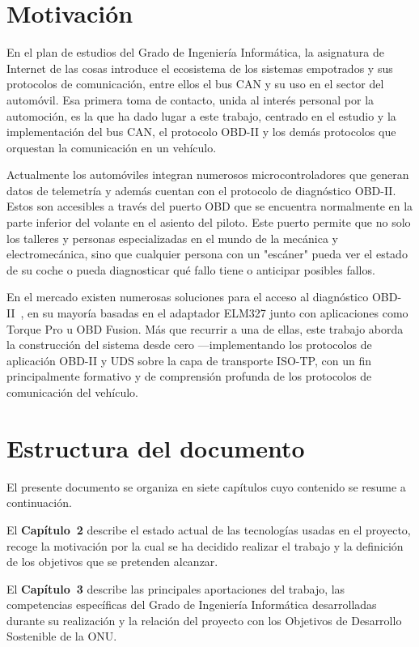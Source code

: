 \section{Motivación}

En el plan de estudios del Grado de Ingeniería Informática, la asignatura de Internet de las cosas introduce el ecosistema de los sistemas empotrados y sus protocolos de comunicación, entre ellos el bus CAN y su uso en el sector del automóvil. Esa primera toma de contacto, unida al interés personal por la automoción, es la que ha dado lugar a este trabajo, centrado en el estudio y la implementación del bus CAN, el protocolo OBD-II y los demás protocolos que orquestan la comunicación en un vehículo.

Actualmente los automóviles integran numerosos microcontroladores que generan datos de telemetría y además cuentan con el protocolo de diagnóstico OBD-II. Estos son accesibles a través del puerto OBD que se encuentra normalmente en la parte inferior del volante en el asiento del piloto. Este puerto permite que no solo los talleres y personas especializadas en el mundo de la mecánica y electromecánica, sino que cualquier persona con un "escáner" pueda ver el estado de su coche o pueda diagnosticar qué fallo tiene o anticipar posibles fallos.

En el mercado existen numerosas soluciones para el acceso al diagnóstico OBD-II~\cite{CSSElec_OBD2}, en su mayoría basadas en el adaptador ELM327 junto con aplicaciones como Torque Pro u OBD Fusion. Más que recurrir a una de ellas, este trabajo aborda la construcción del sistema desde cero —implementando los protocolos de aplicación OBD-II y UDS sobre la capa de transporte ISO-TP, con un fin principalmente formativo y de comprensión profunda de los protocolos de comunicación del vehículo.

\section{Estructura del documento}

El presente documento se organiza en siete capítulos cuyo contenido se resume a continuación.

El \textbf{Capítulo~2} describe el estado actual de las tecnologías usadas en el proyecto, recoge la motivación por la cual se ha decidido realizar el trabajo y la definición de los objetivos que se pretenden alcanzar.

El \textbf{Capítulo~3} describe las principales aportaciones del trabajo, las competencias específicas del Grado de Ingeniería Informática desarrolladas durante su realización y la relación del proyecto con los Objetivos de Desarrollo Sostenible de la ONU.

